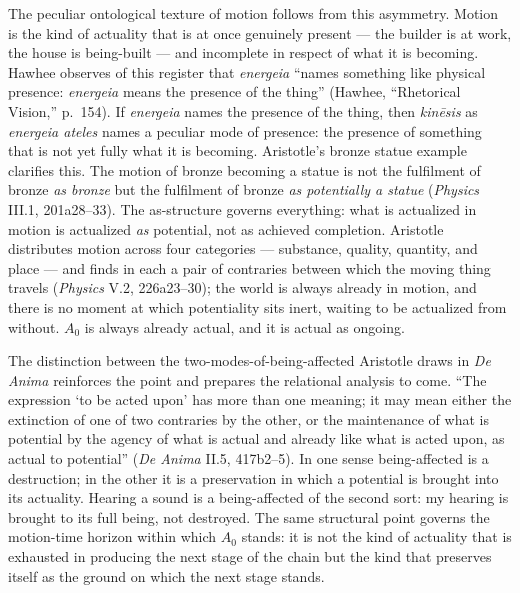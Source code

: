\documentclass{article}
\begin{document}
The peculiar ontological texture of motion follows from this asymmetry. Motion is the kind of actuality that is at once genuinely present --- the builder is at work, the house is being-built --- and incomplete in respect of what it is becoming. Hawhee observes of this register that \textit{energeia} ``names something like physical presence: \textit{energeia} means the presence of the thing'' (Hawhee, ``Rhetorical Vision,'' p.~154). If \textit{energeia} names the presence of the thing, then \textit{kinēsis} as \textit{energeia ateles} names a peculiar mode of presence: the presence of something that is not yet fully what it is becoming. Aristotle's bronze statue example clarifies this. The motion of bronze becoming a statue is not the fulfilment of bronze \textit{as bronze} but the fulfilment of bronze \textit{as potentially a statue} (\textit{Physics} III.1, 201a28--33). The as-structure governs everything: what is actualized in motion is actualized \textit{as} potential, not as achieved completion. Aristotle distributes motion across four categories --- substance, quality, quantity, and place --- and finds in each a pair of contraries between which the moving thing travels (\textit{Physics} V.2, 226a23--30); the world is always already in motion, and there is no moment at which potentiality sits inert, waiting to be actualized from without. $A_0$ is always already actual, and it is actual as ongoing.

The distinction between the two-modes-of-being-affected Aristotle draws in \textit{De Anima} reinforces the point and prepares the relational analysis to come. ``The expression `to be acted upon' has more than one meaning; it may mean either the extinction of one of two contraries by the other, or the maintenance of what is potential by the agency of what is actual and already like what is acted upon, as actual to potential'' (\textit{De Anima} II.5, 417b2--5). In one sense being-affected is a destruction; in the other it is a preservation in which a potential is brought into its actuality. Hearing a sound is a being-affected of the second sort: my hearing is brought to its full being, not destroyed. The same structural point governs the motion-time horizon within which $A_0$ stands: it is not the kind of actuality that is exhausted in producing the next stage of the chain but the kind that preserves itself as the ground on which the next stage stands.
\end{document}
